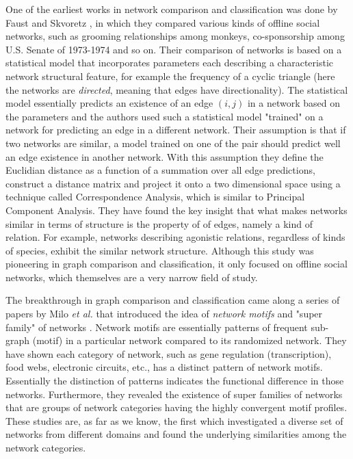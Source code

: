 \documentclass{article}
\begin{document}
	One of the earliest works in network comparison and classification was done by Faust and Skvoretz \cite{Faust.Skvoretz2002Comparing}, in which they compared various kinds of offline social networks, such as grooming relationships among monkeys, co-sponsorship among U.S. Senate of 1973-1974 and so on. Their comparison of networks is based on a statistical model that incorporates parameters each describing a characteristic network structural feature, for example the frequency of a cyclic triangle (here the networks are \textit{directed}, meaning that edges have directionality). The statistical model essentially predicts an existence of an edge $(i,j)$ in a network based on the parameters and the authors used such a statistical model "trained" on a network for predicting an edge in a different network. Their assumption is that if two networks are similar, a model trained on one of the pair should predict well an edge existence in another network. With this assumption they define the Euclidian distance as a function of a summation over all edge predictions, construct a distance matrix and project it onto a two dimensional space using a technique called Correspondence Analysis, which is similar to Principal Component Analysis. They have found the key insight that what makes networks similar in terms of structure is the property of of edges, namely a kind of relation. For example, networks describing agonistic relations, regardless of kinds of species, exhibit the similar network structure. Although this study was pioneering in graph comparison and classification, it only focused on offline social networks, which themselves are a very narrow field of study.
	
	The breakthrough in graph comparison and classification came along a series of papers by Milo \textit{et al.} that introduced the idea of \textit{network motifs} and "super family" of networks \cite{Milo_motif, Milo_SuperFamily}. Network motifs are essentially patterns of frequent sub-graph (motif) in a particular network compared to its randomized network\cite{Milo_motif}. They have shown each category of network, such as gene regulation (transcription), food webs, electronic circuits, etc., has a distinct pattern of network motifs. Essentially the distinction of patterns indicates the functional difference in those networks. Furthermore, they revealed the existence of super families of networks that are groups of network categories having the highly convergent motif profiles. These studies are, as far as we know, the first which investigated a diverse set of networks from different domains and found the underlying similarities among the network categories.
	
\end{document}
